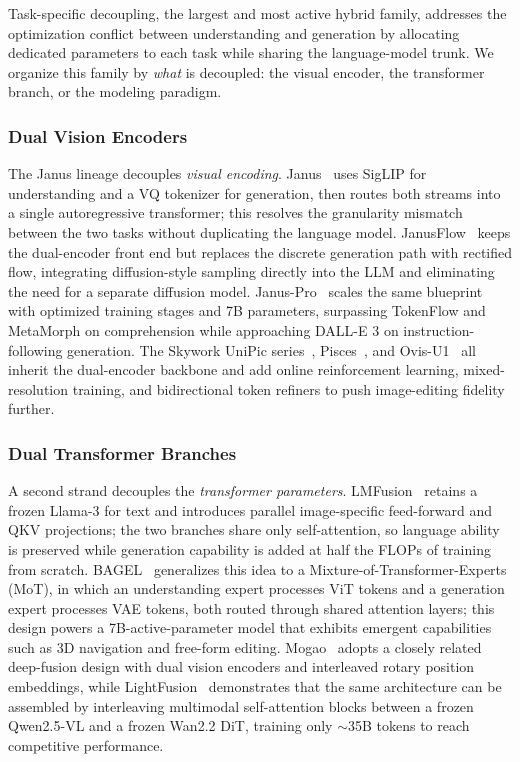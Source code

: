 Task-specific decoupling, the largest and most active hybrid family, addresses the optimization conflict between understanding and generation by allocating dedicated parameters to each task while sharing the language-model trunk. We organize this family by \emph{what} is decoupled: the visual encoder, the transformer branch, or the modeling paradigm.

\subsubsection{Dual Vision Encoders}
\label{subsubsec:dual-enc}

The Janus lineage decouples \emph{visual encoding}. Janus~\cite{DBLP:conf/cvpr/WuCWMLPLXYR025} uses SigLIP for understanding and a VQ tokenizer for generation, then routes both streams into a single autoregressive transformer; this resolves the granularity mismatch between the two tasks without duplicating the language model. JanusFlow~\cite{DBLP:conf/cvpr/MaLCLWWPXZYZW0R25} keeps the dual-encoder front end but replaces the discrete generation path with rectified flow, integrating diffusion-style sampling directly into the LLM and eliminating the need for a separate diffusion model. Janus-Pro~\cite{Chen202517811} scales the same blueprint with optimized training stages and 7B parameters, surpassing TokenFlow and MetaMorph on comprehension while approaching DALL-E 3 on instruction-following generation. The Skywork UniPic series~\cite{Wang202523044,Wei202504548}, Pisces~\cite{Xu202510395}, and Ovis-U1~\cite{Wang202523044} all inherit the dual-encoder backbone and add online reinforcement learning, mixed-resolution training, and bidirectional token refiners to push image-editing fidelity further.

\subsubsection{Dual Transformer Branches}
\label{subsubsec:dual-branch}

A second strand decouples the \emph{transformer parameters}. LMFusion~\cite{Shi202415188} retains a frozen Llama-3 for text and introduces parallel image-specific feed-forward and QKV projections; the two branches share only self-attention, so language ability is preserved while generation capability is added at half the FLOPs of training from scratch. BAGEL~\cite{Deng202514683} generalizes this idea to a Mixture-of-Transformer-Experts (MoT), in which an understanding expert processes ViT tokens and a generation expert processes VAE tokens, both routed through shared attention layers; this design powers a 7B-active-parameter model that exhibits emergent capabilities such as 3D navigation and free-form editing. Mogao~\cite{Liao202505472} adopts a closely related deep-fusion design with dual vision encoders and interleaved rotary position embeddings, while LightFusion~\cite{Wang202523044} demonstrates that the same architecture can be assembled by interleaving multimodal self-attention blocks between a frozen Qwen2.5-VL and a frozen Wan2.2 DiT, training only $\sim$35B tokens to reach competitive performance.


